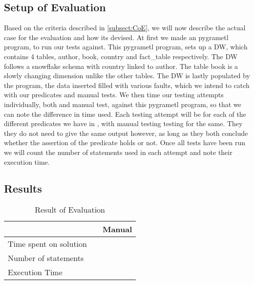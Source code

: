 \subsection{Setup of Evaluation}
Based on the criteria described in \cref{subsect:CoE}, we will now describe the actual case for the evaluation and how its devised. At first we made an pygrametl program, to run our tests against. This pygrametl program, sets up a DW, which contains 4 tables, author, book, country and fact\_table respectively. The DW follows a snowflake schema with country linked to author. The table book is a slowly changing dimension unlike the other tables.
The DW is lastly populated by the program, the data inserted filled with various faults, which we intend to catch with our predicates and manual tests.
We then time our testing attempts individually, both \FW{} and manual test, against this pygrametl program, so that we can note the difference in time used. Each testing attempt will be for each of the different predicates we have in \FW{}, with manual testing testing for the same. They they do not need to give the same output however, as long as they both conclude whether the assertion of the predicate holds or not. Once all tests have been run we will count the number of statements used in each attempt and note their execution time.


\subsection{Results}

\begin{table}[h]
\centering
\caption{Result of Evaluation}
\label{table:result}
\begin{tabular}{|p{}|p{}|p{}|}
\hline
												& \FW{}	 	& Manual				  \\ \hline
Time spent on solution 	&         &                	\\ \hline
Number of statements   	&         &                	\\ \hline
Execution Time         	&         &                	\\ \hline
\end{tabular}
\end{table}








